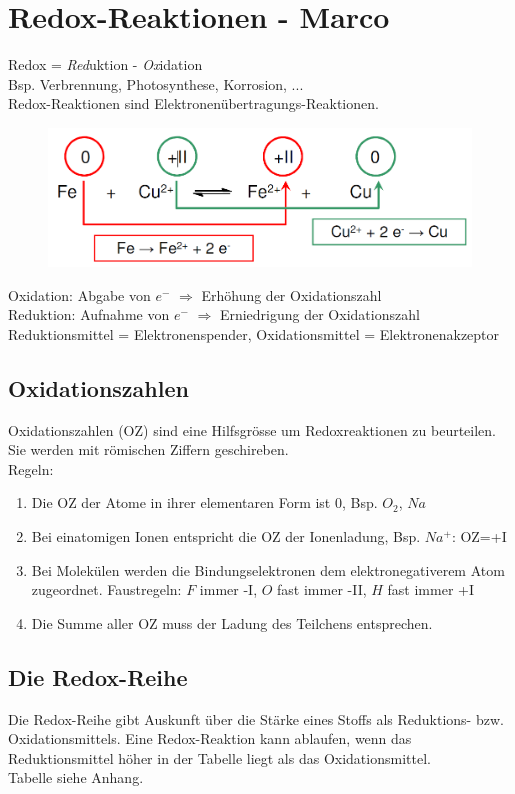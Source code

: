 \section{Redox-Reaktionen - Marco}
Redox = \emph{Red}uktion - \emph{Ox}idation \\
Bsp. Verbrennung, Photosynthese, Korrosion, ... \\

Redox-Reaktionen sind Elektronenübertragungs-Reaktionen.
\begin{figure}[htbp]
	\centering
	\includegraphics[width=0.6\linewidth]{images/9_Redox_Reaktion.png}
\end{figure}

Oxidation: Abgabe von $e^-$ $\Rightarrow$ Erhöhung der Oxidationszahl \\
Reduktion: Aufnahme von $e^-$ $\Rightarrow$ Erniedrigung der Oxidationszahl \\

Reduktionsmittel = Elektronenspender, Oxidationsmittel = Elektronenakzeptor


\subsection{Oxidationszahlen}
Oxidationszahlen (OZ) sind eine Hilfsgrösse um Redoxreaktionen zu beurteilen. Sie werden mit römischen Ziffern geschireben. \\
Regeln:
\begin{enumerate}
	\item Die OZ der Atome in ihrer elementaren Form ist 0, Bsp. $O_2$, $Na$
	\item Bei einatomigen Ionen entspricht die OZ der Ionenladung, Bsp. $Na^+$: OZ=+I
	\item Bei Molekülen werden die Bindungselektronen dem elektronegativerem Atom zugeordnet. Faustregeln: $F$ immer -I, $O$ fast immer -II, $H$ fast immer +I
	\item Die Summe aller OZ muss der Ladung des Teilchens entsprechen.
\end{enumerate}

\subsection{Die Redox-Reihe}
Die Redox-Reihe gibt Auskunft über die Stärke eines Stoffs als Reduktions- bzw. Oxidationsmittels. Eine Redox-Reaktion kann ablaufen, wenn das Reduktionsmittel höher in der Tabelle liegt als das Oxidationsmittel.\\

Tabelle siehe Anhang. \\


